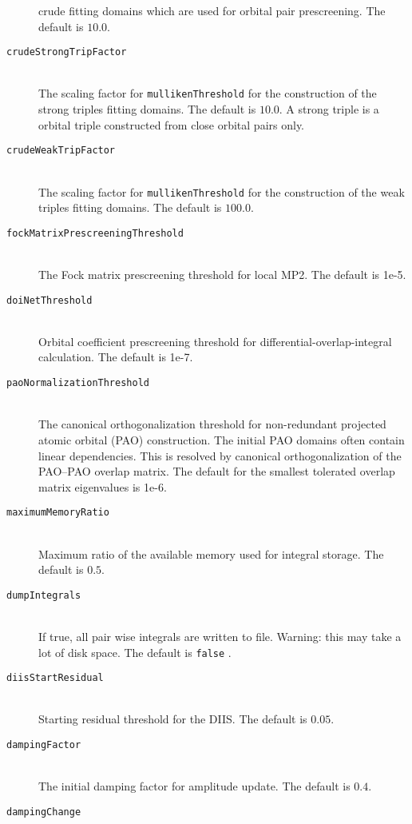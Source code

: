 \documentclass[bibliography=totocnumbered,a4paper,10pt,oneside]{scrbook}
\newcommand{\ttt}[1]{%
  \begingroup\setlength{\fboxsep}{1pt}%
  \colorbox{serenity-green!30}{\texttt{\hspace*{2pt}\vphantom{(g}#1\hspace*{2pt}}}%
  \endgroup
}
\begin{document}
\begin{description}
    crude fitting domains which are used for orbital pair prescreening. The default is $10.0$.
    \item [\texttt{crudeStrongTripFactor}]\hfill \\
    The scaling factor for \ttt{mullikenThreshold} for the construction of the strong triples
    fitting domains. The default is $10.0$. A strong triple is a orbital triple constructed from
    close orbital pairs only.
    \item [\texttt{crudeWeakTripFactor}]\hfill \\
    The scaling factor for \ttt{mullikenThreshold} for the construction of the weak triples
    fitting domains. The default is $100.0$.
    \item [\texttt{fockMatrixPrescreeningThreshold}]\hfill \\
    The Fock matrix prescreening threshold for local MP2. The default is 1e-5.
    \item [\texttt{doiNetThreshold}]\hfill \\
    Orbital coefficient prescreening threshold for differential-overlap-integral calculation. The default
    is 1e-7.
    \item [\texttt{paoNormalizationThreshold}]\hfill \\
    The canonical orthogonalization threshold for non-redundant projected atomic orbital (PAO) construction.
    The initial PAO domains often contain linear dependencies. This is resolved by canonical orthogonalization of
    the PAO--PAO overlap matrix. The default for the smallest tolerated overlap matrix eigenvalues is
    1e-6.
    \item [\texttt{maximumMemoryRatio}]\hfill \\
    Maximum ratio of the available memory used for integral storage. The default is $0.5$.
    \item [\texttt{dumpIntegrals}]\hfill \\
    If true, all pair wise integrals are written to file. Warning: this may take a lot of disk space.
    The default is \ttt{false}.
    \item [\texttt{diisStartResidual}]\hfill \\
    Starting residual threshold for the DIIS. The default is $0.05$.
    \item [\texttt{dampingFactor}]\hfill \\
    The initial damping factor for amplitude update. The default is $0.4$.
    \item [\texttt{dampingChange}]\hfill \\

\end{description}
\end{document}
